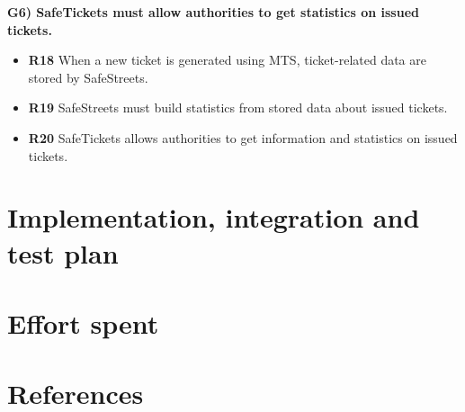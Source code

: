 \documentclass[a4paper]{article}
\begin{document}
\textbf{G6) SafeTickets must allow authorities to get statistics on
issued tickets.}

\begin{itemize}
\item
  \textbf{R18} When a new ticket is generated using MTS, ticket-related
  data are stored by SafeStreets.
\item
  \textbf{R19} SafeStreets must build statistics from stored data about
  issued tickets.
\item
  \textbf{R20} SafeTickets allows authorities to get information and
  statistics on issued tickets.
\end{itemize}


\newpage
\section{Implementation, integration and test plan}
\newpage
\section{Effort spent}
\section{References}
\end{document}
